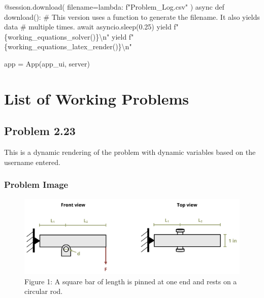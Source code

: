 \documentclass[
  letterpaper,
  DIV=11,
  numbers=noendperiod]{scrreprt}
\newenvironment{Shaded}{\begin{snugshade}}{\end{snugshade}}
\newcommand{\NormalTok}[1]{\textcolor[rgb]{0.00,0.23,0.31}{#1}}
\begin{document}
\begin{Shaded}
\begin{Highlighting}[]
        
\NormalTok{    @session.download(}
\NormalTok{    filename=lambda: f"Problem\_Log.csv"}
\NormalTok{    )}
\NormalTok{    async def download():}
\NormalTok{        \# This version uses a function to generate the filename. It also yields data}
\NormalTok{        \# multiple times.}
\NormalTok{          await asyncio.sleep(0.25)}
\NormalTok{          yield f"\{working\_equations\_solver()\}\textbackslash{}n"}
\NormalTok{          yield f"\{working\_equations\_latex\_render()\}\textbackslash{}n"}

\NormalTok{app = App(app\_ui, server)}



\end{Highlighting}
\end{Shaded}

\part{List of Working Problems}

\chapter*{Problem 2.23}\label{problem-2.23}


This is a dynamic rendering of the problem with dynamic variables based
on the username entered.

\section*{Problem Image}\label{problem-image-10}


\begin{figure}[H]

{\centering \includegraphics{images/168.png}

}

\caption{Figure 1: A square bar of length is pinned at one end and rests
on a circular rod.}

\end{figure}%
\end{document}

